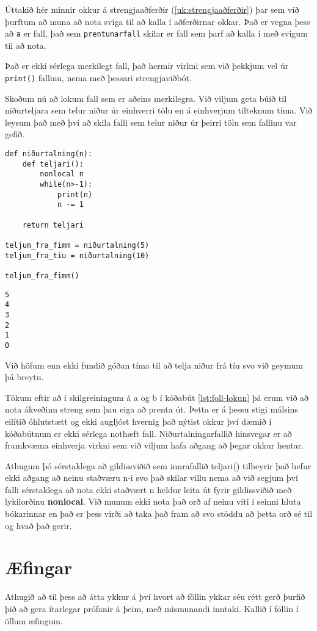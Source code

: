 Úttakið hér minnir okkur á strengjaaðferðir (\ref{uk:strengjaaðferðir}) þar sem við þurftum að muna að nota sviga til að kalla í aðferðirnar okkar.
Það er vegna þess að \texttt{a} er fall, það sem \texttt{prentunarfall} skilar er fall sem þarf að kalla í með svigum til að nota.

Það er ekki sérlega merkilegt fall, það hermir virkni sem við þekkjum vel úr \texttt{print()} fallinu, nema með þessari strengjaviðbót.

Skoðum nú að lokum fall sem er aðeins merkilegra.
Við viljum geta búið til niðurteljara sem telur niður úr einhverri tölu en á einhverjum tilteknum tíma.
Við leysum það með því að skila falli sem telur niður úr þeirri tölu sem fallinu var gefið.


\begin{lstlisting}[caption=Innri föll kynnt, label=lst:foll-lokun2]
def niðurtalning(n):
	def teljari():
		nonlocal n
		while(n>-1):
			print(n)
			n -= 1
	
	return teljari
	
teljum_fra_fimm = niðurtalning(5)
teljum_fra_tiu = niðurtalning(10)

teljum_fra_fimm()
\end{lstlisting}
\lstset{style=uttak}
\begin{lstlisting}
5
4
3
2
1
0
\end{lstlisting}
\lstset{style=venjulegt}

Við höfum enn ekki fundið góðan tíma til að telja niður frá tíu svo við geymum þá breytu.

Tökum eftir að í skilgreiningum á a og b í kóðabút \ref{lst:foll-lokun} þá erum við að nota ákveðinn streng sem þau eiga að prenta út.
Þetta er á þessu stigi málsins eilítið óhlutstætt og ekki augljóst hvernig það nýtist okkur því dæmið í kóðabútnum er ekki sérlega nothæft fall.
Niðurtalningarfallið hinsvegar er að framkvæma einhverja virkni sem við viljum hafa aðgang að þegar okkur hentar.

Athugum þó sérstaklega að gildissviðið sem innrafallið teljari() tilheyrir það hefur ekki aðgang að neinu staðværu n-i svo það skilar villu nema að við segjum því falli sérstaklega að nota ekki staðvært n heldur leita út fyrir gildissviðið með lykilorðinu \textbf{nonlocal}.
Við munum ekki nota það orð af neinu viti í seinni hluta bókarinnar en það er þess virði að taka það fram að svo stöddu að þetta orð sé til og hvað það gerir.

\newpage
\section{Æfingar}
Athugið að til þess að átta ykkur á því hvort að föllin ykkar séu rétt gerð þurfið þið að gera ítarlegar prófanir á þeim, með mismunandi inntaki.
Kallið í föllin í öllum æfingum.

